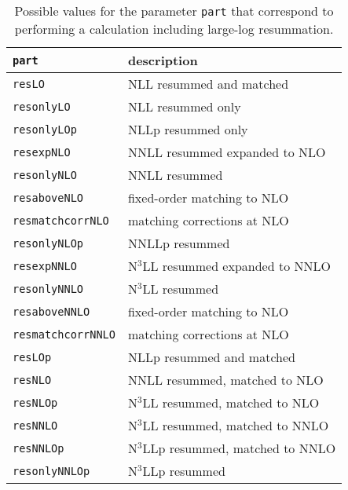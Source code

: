 \begin{longtable}{p{4.5cm}p{9.0cm}}
\caption{Possible values for the parameter \texttt{part} that correspond to
performing a calculation including large-log resummation. \label{tab:partchoicesresum}} \\
		\hline
		\texttt{part} & description\\
		\hline
                         {\tt resLO} & NLL resummed and matched
			 \\
                         {\tt resonlyLO} & NLL resummed only
			 \\
                         {\tt resonlyLOp} & NLLp resummed only
			 \\
                         {\tt resexpNLO} & NNLL resummed expanded to NLO
			 \\
                         {\tt resonlyNLO} & NNLL resummed
			 \\
                         {\tt resaboveNLO} & fixed-order matching to NLO
			 \\
                         {\tt resmatchcorrNLO} & matching corrections at NLO
			 \\
                         {\tt resonlyNLOp} & NNLLp resummed
			 \\
                         {\tt resexpNNLO} & N$^3$LL resummed expanded to NNLO
			 \\
                         {\tt resonlyNNLO} & N$^3$LL resummed
			 \\
                         {\tt resaboveNNLO} & fixed-order matching to NLO
			 \\
                         {\tt resmatchcorrNNLO} & matching corrections at NLO
			 \\
                         {\tt resLOp} & NLLp resummed and matched
			 \\
                         {\tt resNLO} & NNLL resummed, matched to NLO
			 \\
                         {\tt resNLOp} & N$^3$LL resummed, matched to NLO
			 \\
                         {\tt resNNLO} & N$^3$LL resummed, matched to NNLO
			 \\
                         {\tt resNNLOp} & N$^3$LLp resummed, matched to NNLO
			 \\
                         {\tt resonlyNNLOp} & N$^3$LLp resummed
\end{longtable}

